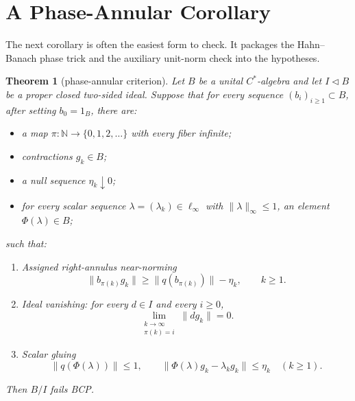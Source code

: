 \documentclass[11pt]{article}
\newtheorem{theorem}{Theorem}
\newcommand{\N}{\mathbb N}
\begin{document}
\section*{A Phase-Annular Corollary}

The next corollary is often the easiest form to check.  It packages the
Hahn--Banach phase trick and the auxiliary unit-norm check into the
hypotheses.

\begin{theorem}[phase-annular criterion]
\label{thm:phase-annular}
Let \(B\) be a unital \(C^*\)-algebra and let \(I\triangleleft B\) be a
proper closed two-sided ideal.  Suppose that for every sequence
\((b_i)_{i\ge1}\subset B\), after setting \(b_0=1_B\), there are:
\begin{itemize}
\item a map \(\pi:\N\to\{0,1,2,\ldots\}\) with every fiber infinite;
\item contractions \(g_k\in B\);
\item a null sequence \(\eta_k\downarrow0\);
\item for every scalar sequence \(\lambda=(\lambda_k)\in\ell_\infty\) with
\(\|\lambda\|_\infty\le1\), an element \(\Phi(\lambda)\in B\);
\end{itemize}
such that:
\begin{enumerate}
\item \emph{Assigned right-annulus near-norming}
\[
        \|b_{\pi(k)}g_k\|
        \ge
        \|q(b_{\pi(k)})\|-\eta_k,\qquad k\ge1.
\]
\item \emph{Ideal vanishing}: for every \(d\in I\) and every
\(i\ge0\),
\[
        \lim_{\substack{k\to\infty\\ \pi(k)=i}}\|dg_k\|=0 .
\]
\item \emph{Scalar gluing}
\[
        \|q(\Phi(\lambda))\|\le1,
        \qquad
        \|\Phi(\lambda)g_k-\lambda_kg_k\|\le\eta_k
        \quad(k\ge1).
\]
\end{enumerate}
Then \(B/I\) fails BCP.
\end{theorem}
\end{document}

